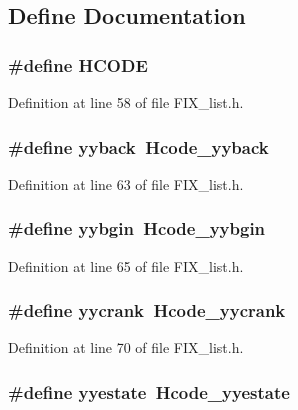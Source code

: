 \subsection{Define Documentation}
\subsubsection{\setlength{\rightskip}{0pt plus 5cm}\#define HCODE}\label{FIX__list_8h_f918ab5b43b7193ccf30754fe57a5d55}




Definition at line 58 of file FIX\_\-list.h.
\subsubsection{\setlength{\rightskip}{0pt plus 5cm}\#define yyback~Hcode\_\-yyback}\label{FIX__list_8h_c78f1e6f871c401a0ba5c0550b9490dd}




Definition at line 63 of file FIX\_\-list.h.
\subsubsection{\setlength{\rightskip}{0pt plus 5cm}\#define \bf{yybgin}~Hcode\_\-yybgin}\label{FIX__list_8h_f8bda85b061fed32e7319b181de70607}




Definition at line 65 of file FIX\_\-list.h.
\subsubsection{\setlength{\rightskip}{0pt plus 5cm}\#define \bf{yycrank}~Hcode\_\-yycrank}\label{FIX__list_8h_a983bbc3757e6ff6025f5c357148a0cf}




Definition at line 70 of file FIX\_\-list.h.
\subsubsection{\setlength{\rightskip}{0pt plus 5cm}\#define \bf{yyestate}~Hcode\_\-yyestate}\label{FIX__list_8h_e89efef7288c76e7485f82600873078f}





